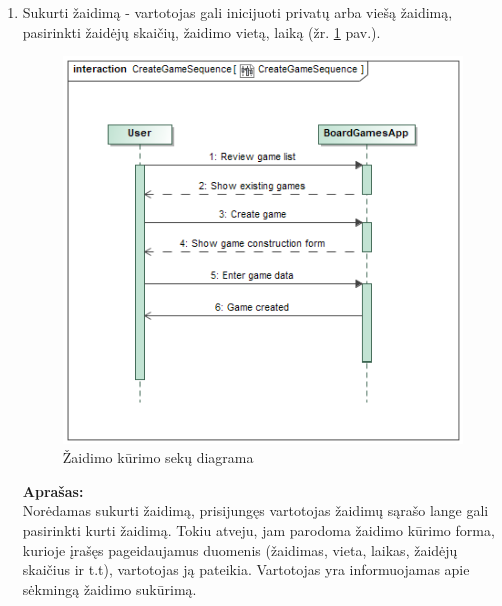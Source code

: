 \documentclass{VUMIFPSkursinis}
\begin{document}
\begin{enumerate}
			\item Sukurti žaidimą - vartotojas gali inicijuoti privatų arba viešą 
			žaidimą, pasirinkti žaidėjų skaičių, žaidimo vietą, laiką (žr. \ref{img:CreateGameSequence} pav.).
				\begin{figure}[H]
					\centering
					\includegraphics[scale=0.5]{img/CreateGameSequence}
					\caption{Žaidimo kūrimo sekų diagrama}
					\label{img:CreateGameSequence}
				\end{figure}
				\textbf{Aprašas:}\\
					Norėdamas sukurti žaidimą, prisijungęs vartotojas žaidimų sąrašo 
					lange gali pasirinkti kurti žaidimą. Tokiu atveju, jam parodoma 
					žaidimo kūrimo forma, kurioje įrašęs pageidaujamus duomenis 
					(žaidimas, vieta, laikas, žaidėjų skaičius ir t.t), vartotojas ją 
					pateikia. Vartotojas yra informuojamas apie sėkmingą žaidimo sukūrimą.	
					

\end{enumerate}
\end{document}
